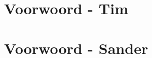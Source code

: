 \documentclass[master=cws,dutch,masteroption={vs,gs},inputenc=utf8]{kulemt}
\begin{document}

\chapter*{Voorwoord - Tim}

\chapter*{Voorwoord - Sander}

\tableofcontents*
\end{document}

